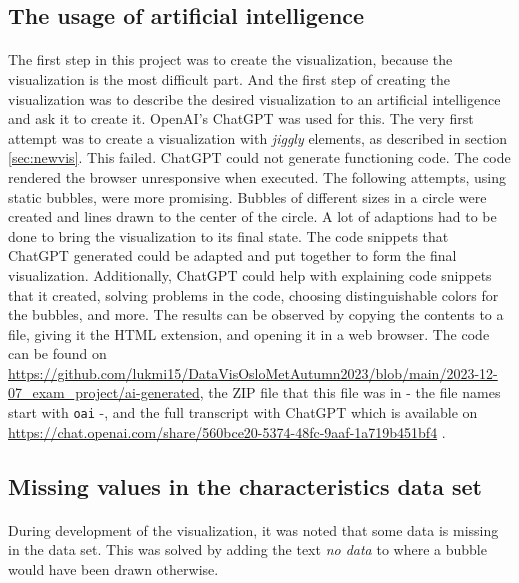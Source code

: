 \documentclass[12pt, a4paper]{article}
\begin{document}
		\subsection{The usage of artificial intelligence}
			\paragraph{}
				The first step in this project was to create the visualization, because the visualization is the most difficult part. And the first step of creating the visualization was to describe the desired visualization to an artificial intelligence and ask it to create it. OpenAI's ChatGPT was used for this. The very first attempt was to create a visualization with \textit{jiggly} elements, as described in section \ref{sec:newvis}. This failed. ChatGPT could not generate functioning code. The code rendered the browser unresponsive when executed. The following attempts, using static bubbles, were more promising. Bubbles of different sizes in a circle were created and lines drawn to the center of the circle. A lot of adaptions had to be done to bring the visualization to its final state. The code snippets that ChatGPT generated could be adapted and put together to form the final visualization. Additionally, ChatGPT could help with explaining code snippets that it created, solving problems in the code, choosing distinguishable colors for the bubbles, and more. The results can be observed by copying the contents to a file, giving it the HTML extension, and opening it in a web browser. The code can be found on \href{https://github.com/lukmi15/DataVisOsloMetAutumn2023/blob/main/2023-12-07\_exam\_project/ai-generated}{https://github.com/lukmi15/DataVisOsloMetAutumn2023/blob/main/2023-12-07\_exam\_project/ai-generated}, the ZIP file that this file was in - the file names start with \texttt{oai} -, and the full transcript with ChatGPT which is available on \href{ https://chat.openai.com/share/560bce20-5374-48fc-9aaf-1a719b451bf4}{https://chat.openai.com/share/560bce20-5374-48fc-9aaf-1a719b451bf4} .
		\subsection{Missing values in the characteristics data set}
			\paragraph{}
				During development of the visualization, it was noted that some data is missing in the data set. This was solved by adding the text \textit{no data} to where a bubble would have been drawn otherwise.
\end{document}
